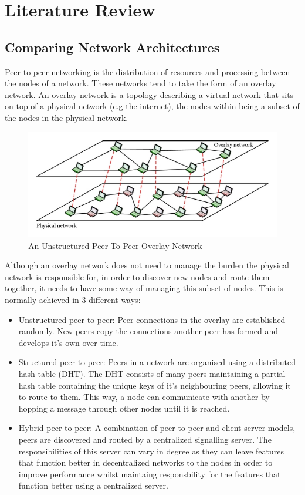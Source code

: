 \documentclass[]{report}
\begin{document}
	\section{Literature Review}
	
		\subsection*{Comparing Network Architectures}	
			Peer-to-peer networking is the distribution of resources and processing between the nodes of a network. These networks tend to take the form of an overlay network. An overlay network is a topology describing a virtual network that sits on top of a physical network (e.g the internet), the nodes within being a subset of the nodes in the physical network. 
			
			\begin{figure}[h]
				\caption{
					An Unstructured Peer-To-Peer Overlay Network 	
					\cite{Unstructured P2P Diagram}
				}
				\centering
				\includegraphics{overlaynetwork.jpg}
			\end{figure}
			
			Although an overlay network does not need to manage the burden the physical network is responsible for, in order to discover new nodes and route them together, it needs to have some way of managing this subset of nodes. This is normally achieved in 3 different ways:
			
			\begin{itemize}
				\item Unstructured peer-to-peer:
				Peer connections in the overlay are established randomly. New peers copy the connections another peer has formed and develops it's own over time. \cite{P2P overlay networks}
				\item Structured peer-to-peer:
				Peers in a network are organised using a distributed hash table (DHT). The DHT consists of many peers maintaining a partial hash table containing the unique keys of it's neighbouring peers, allowing it to route to them. This way, a node can communicate with another by hopping a message through other nodes until it is reached. \cite{P2P overlay networks}
				\item Hybrid peer-to-peer:
				A combination of  peer to peer and client-server models, peers are discovered and routed by a centralized signalling server. The responsibilities of this server can vary in degree as they can leave features that function better in decentralized networks to the nodes in order to improve performance whilst maintaing responsbility for the features that function better using a centralized server.\cite{Hybrid P2P network}
			\end{itemize}
			
\end{document}
